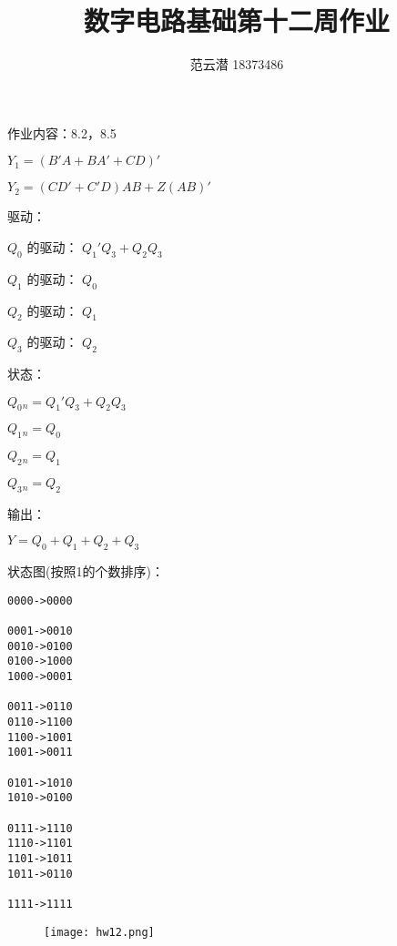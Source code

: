 \documentclass[lang=cn,11pt,a4paper,cite=authoryear,twocolumn]{elegantpaper}
\title{数字电路基础\quad 第十二周作业}
\author{范云潜 18373486}
\institute{微电子学院 184111 班}
\date{\zhtoday}
\begin{document}
\maketitle

作业内容：8.2，8.5


\(Y_1 = (B' A + B A' + C D ) ' \) 

\(Y_2 = (C D' + C' D) A B + Z (AB)' \) 


驱动：

\(Q_0\) 的驱动： \(Q_1' Q_3 + Q_2 Q_3\) 

\(Q_1\) 的驱动： \(Q_0\) 

\(Q_2\) 的驱动： \(Q_1\) 

\(Q_3\) 的驱动： \(Q_2\) 

状态：

\(Q_0 {} _{n}  = Q_1' Q_3 + Q_2 Q_3\) 

\(Q_1 {} _{n}  = Q_0\) 

\(Q_2 {} _{n}  = Q_1\) 

\(Q_3 {} _{n}  = Q_2\) 

输出：

\(Y = Q_0 + Q_1 + Q_2 + Q_3\) 

状态图(按照1的个数排序)：

\begin{lstlisting}
0000->0000

0001->0010
0010->0100
0100->1000
1000->0001

0011->0110
0110->1100
1100->1001
1001->0011

0101->1010
1010->0100

0111->1110
1110->1101
1101->1011
1011->0110

1111->1111
\end{lstlisting}

\begin{figure}[!htb]
    \centering
    \texttt{[image: hw12.png]}
\end{figure}

\end{document}
